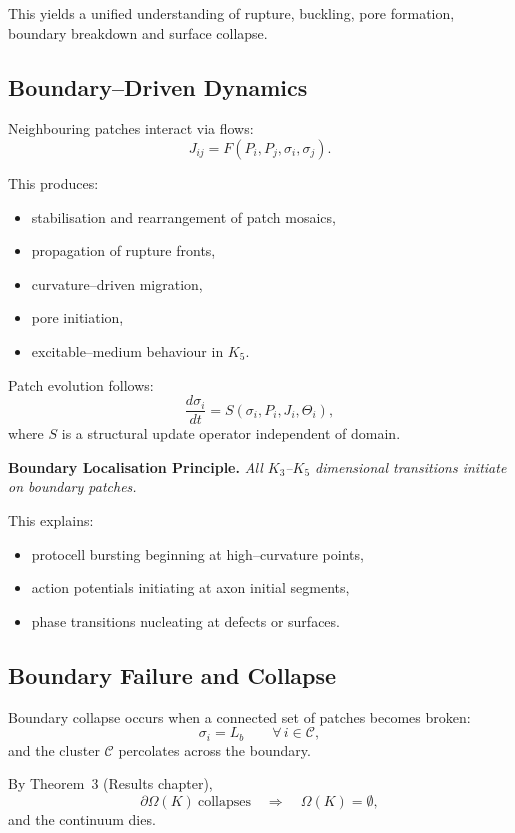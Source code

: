 This yields a unified understanding of rupture, buckling, pore formation,
boundary breakdown and surface collapse.

\subsection{Boundary–Driven Dynamics}

Neighbouring patches interact via flows:
\[
  J_{ij} = F(P_i, P_j, \sigma_i, \sigma_j).
\]

This produces:
\begin{itemize}
    \item stabilisation and rearrangement of patch mosaics,
    \item propagation of rupture fronts,
    \item curvature–driven migration,
    \item pore initiation,
    \item excitable–medium behaviour in \(K_5\).
\end{itemize}

Patch evolution follows:
\[
  \frac{d\sigma_i}{dt}
  = S(\sigma_i, P_i, J_i, \Theta_i),
\]
where \(S\) is a structural update operator independent of domain.

\medskip
\textbf{Boundary Localisation Principle.}
\emph{All \(K_3\)--\(K_5\) dimensional transitions initiate on boundary patches.}

This explains:
\begin{itemize}
    \item protocell bursting beginning at high–curvature points,
    \item action potentials initiating at axon initial segments,
    \item phase transitions nucleating at defects or surfaces.
\end{itemize}

\subsection{Boundary Failure and Collapse}

Boundary collapse occurs when a connected set of patches becomes broken:
\[
  \sigma_i = L_b
  \qquad \forall\, i \in \mathcal{C},
\]
and the cluster \(\mathcal{C}\) percolates across the boundary.

By Theorem~3 (Results chapter),
\[
  \partial\Omega(K)\ \text{collapses}
  \quad\Longrightarrow\quad
  \Omega(K) = \emptyset,
\]
and the continuum dies.


